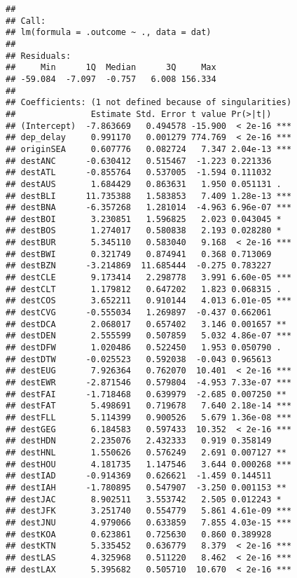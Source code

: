 \documentclass[
]{article}
\begin{document}
\begin{verbatim}
## 
## Call:
## lm(formula = .outcome ~ ., data = dat)
## 
## Residuals:
##     Min      1Q  Median      3Q     Max 
## -59.084  -7.097  -0.757   6.008 156.334 
## 
## Coefficients: (1 not defined because of singularities)
##               Estimate Std. Error t value Pr(>|t|)    
## (Intercept)  -7.863669   0.494578 -15.900  < 2e-16 ***
## dep_delay     0.991170   0.001279 774.769  < 2e-16 ***
## originSEA     0.607776   0.082724   7.347 2.04e-13 ***
## destANC      -0.630412   0.515467  -1.223 0.221336    
## destATL      -0.855764   0.537005  -1.594 0.111032    
## destAUS       1.684429   0.863631   1.950 0.051131 .  
## destBLI      11.735388   1.583853   7.409 1.28e-13 ***
## destBNA      -6.357268   1.281014  -4.963 6.96e-07 ***
## destBOI       3.230851   1.596825   2.023 0.043045 *  
## destBOS       1.274017   0.580838   2.193 0.028280 *  
## destBUR       5.345110   0.583040   9.168  < 2e-16 ***
## destBWI       0.321749   0.874941   0.368 0.713069    
## destBZN      -3.214869  11.685444  -0.275 0.783227    
## destCLE       9.173414   2.298778   3.991 6.60e-05 ***
## destCLT       1.179812   0.647202   1.823 0.068315 .  
## destCOS       3.652211   0.910144   4.013 6.01e-05 ***
## destCVG      -0.555034   1.269897  -0.437 0.662061    
## destDCA       2.068017   0.657402   3.146 0.001657 ** 
## destDEN       2.555599   0.507859   5.032 4.86e-07 ***
## destDFW       1.020486   0.522450   1.953 0.050790 .  
## destDTW      -0.025523   0.592038  -0.043 0.965613    
## destEUG       7.926364   0.762070  10.401  < 2e-16 ***
## destEWR      -2.871546   0.579804  -4.953 7.33e-07 ***
## destFAI      -1.718468   0.639979  -2.685 0.007250 ** 
## destFAT       5.498691   0.719678   7.640 2.18e-14 ***
## destFLL       5.114399   0.900526   5.679 1.36e-08 ***
## destGEG       6.184583   0.597433  10.352  < 2e-16 ***
## destHDN       2.235076   2.432333   0.919 0.358149    
## destHNL       1.550626   0.576249   2.691 0.007127 ** 
## destHOU       4.181735   1.147546   3.644 0.000268 ***
## destIAD      -0.914369   0.626621  -1.459 0.144511    
## destIAH      -1.780895   0.547907  -3.250 0.001153 ** 
## destJAC       8.902511   3.553742   2.505 0.012243 *  
## destJFK       3.251740   0.554779   5.861 4.61e-09 ***
## destJNU       4.979066   0.633859   7.855 4.03e-15 ***
## destKOA       0.623861   0.725630   0.860 0.389928    
## destKTN       5.335452   0.636779   8.379  < 2e-16 ***
## destLAS       4.325968   0.511220   8.462  < 2e-16 ***
## destLAX       5.395682   0.505710  10.670  < 2e-16 ***

\end{verbatim}
\end{document}
